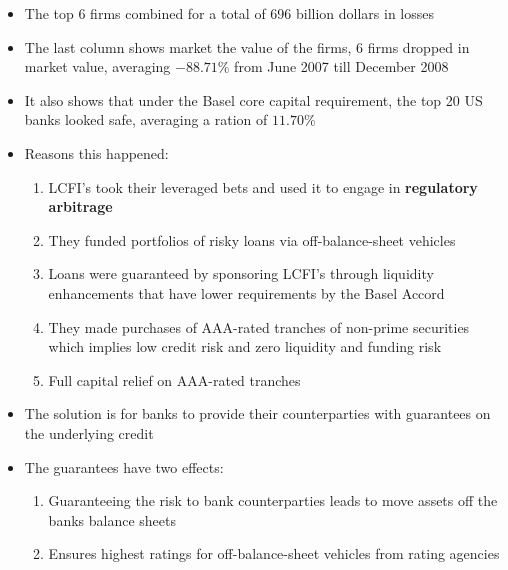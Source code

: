 \documentclass[11pt]{beamer}
\newcommand{\mcdr}[1]{{{\bf \color{red4}#1}}}
\begin{document}
\begin{frame}
\begin{itemize}
\item The top 6 firms combined for a total of 696 billion dollars in losses
\item The last column shows market the value of the firms, 6 firms dropped in market value, averaging $-88.71$\% from June 2007 till December 2008
\item It also shows that under the Basel core capital requirement, the top 20 US banks looked safe, averaging a ration of $11.70$\%
\item Reasons this happened:
\begin{enumerate}
\item LCFI's took their leveraged bets and used it to engage in \mcdr{regulatory arbitrage}
\item They funded portfolios of risky loans via off-balance-sheet vehicles
\item Loans were guaranteed by sponsoring LCFI's through liquidity enhancements that have lower requirements by the Basel Accord
\item They made purchases of AAA-rated tranches of non-prime securities which implies low credit risk and zero liquidity and funding risk
\item Full capital relief on AAA-rated tranches
\end{enumerate}
\end{itemize}
\end{frame}

\begin{frame}
\begin{itemize}
\item The solution is for banks to provide their counterparties with guarantees on the underlying credit
\item The guarantees have two effects:
\begin{enumerate}
\item Guaranteeing the risk to bank counterparties leads to move assets off the banks balance sheets
\item Ensures highest ratings for off-balance-sheet vehicles from rating agencies
\end{enumerate}

\end{itemize}
\end{frame}
\end{document}
